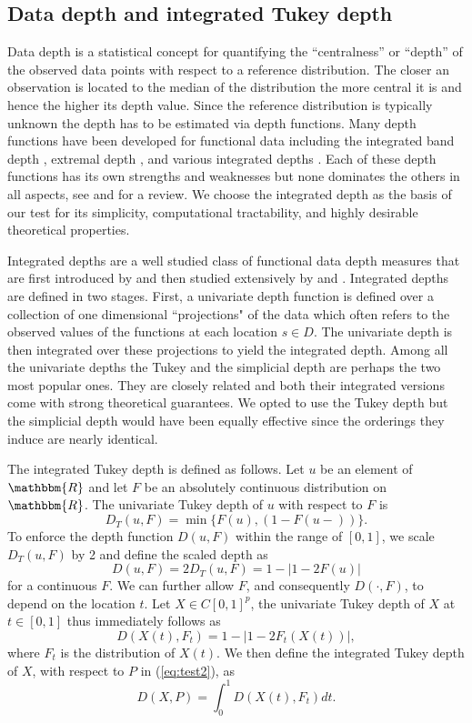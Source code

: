 \documentclass[12pt]{article}
\begin{document}
\subsection{Data depth and integrated Tukey depth} \label{depth}
Data depth is a statistical concept for quantifying the ``centralness'' or ``depth'' of the observed data points with respect to a reference distribution. The closer an observation is located to the median of the distribution the more central it is and hence the higher its depth value. Since the reference distribution is typically unknown the depth has to be estimated via depth functions. Many depth functions have been developed for functional data including the integrated band depth \citep{banddepth}, extremal depth \citep{naveen}, and various integrated depths \citep{muniz}. Each of these depth functions has its own strengths and weaknesses but none dominates the others in all aspects, see \citet{cuevas} and \citet{nagy} for a review. We choose the integrated depth as the basis of our test for its simplicity, computational tractability, and highly desirable theoretical properties. 

Integrated depths are a well studied class of functional data depth measures that are first introduced by \citet{muniz} and then studied extensively by \citet{cuevas} and \citet{nagy}. Integrated depths are defined in two stages. First, a univariate depth function is defined over a collection of one dimensional ``projections" of the data which often refers to the observed values of the functions at each location $s \in D$. The univariate depth is then integrated over these projections to yield the integrated depth. Among all the univariate depths the Tukey and the simplicial depth are perhaps the two most popular ones. They are closely related and both their integrated versions come with strong theoretical guarantees. We opted to use the Tukey depth but the simplicial depth would have been equally effective since the orderings they induce are nearly identical.

The integrated Tukey depth is defined as follows. Let $u$ be an element of $\mathbbm{R}$ and let $F$ be an absolutely continuous distribution on $\mathbbm{R}$. The univariate Tukey depth of $u$ with respect to $F$ is 
\[
D_T(u, F) = \min \{F(u), (1 - F(u-))\}.
\]
To enforce the depth function $D(u, F)$ within the range of $[0, 1]$, we scale $D_T(u, F)$ by 2 and define the scaled depth as
\[
D(u, F) = 2D_T(u, F) = 1 - |1 - 2F(u)|
\]
for a continuous $F$. We can further allow $F$, and consequently $D(\cdot, F)$, to depend on the location $t$. Let $X \in  C[0, 1]^p$, the univariate Tukey depth of $X$ at $t \in [0, 1]$ thus immediately follows as 
\[
D(X(t), F_t) = 1 - |1 - 2F_t(X(t))|,
\]
where $F_t$ is the distribution of $X(t)$. We then define the integrated Tukey depth of $X$, with respect to $P$ in (\ref{eq:test2}), as
\[
D(X, P) = \int_0^1D(X(t), F_t)dt.
\]
\end{document}
